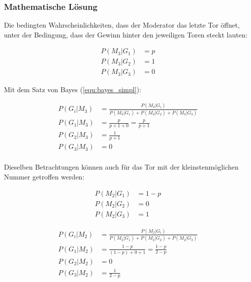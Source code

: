 \subsubsection{Mathematische Lösung}

Die bedingten Wahrscheinlichkeiten, dass der Moderator das letzte Tor öffnet, unter der Bedingung, dass der Gewinn hinter den jeweiligen Toren steckt lauten:

\begin{align*}
    P(M_3 | G_1) & = p \\
    P(M_3 | G_2) & = 1 \\
    P(M_3 | G_3) & = 0
\end{align*}

Mit dem Satz von Bayes (\autoref{equ:bayes_simpl}):

\begin{align*}
    P(G_i | M_3) & = \frac{P(M_3 | G_i)}{P(M_3 | G_1) + P(M_3 | G_2) + P(M_3 | G_3)} \\
    P(G_1 | M_3) & = \frac{p}{p+1+0} = \frac{p}{p+1}                                 \\
    P(G_2 | M_3) & = \frac{1}{p+1}                                                   \\
    P(G_3 | M_3) & = 0                                                               \\
\end{align*}

Dieselben Betrachtungen können auch für das Tor mit der kleinstenmöglichen Nummer getroffen werden:

\begin{align*}
    P(M_2 | G_1) & = 1 - p \\
    P(M_2 | G_2) & = 0     \\
    P(M_2 | G_3) & = 1
\end{align*}

\begin{align*}
    P(G_i | M_2) & = \frac{P(M_2 | G_i)}{P(M_2 | G_1) + P(M_2 | G_2) + P(M_2 | G_3)} \\
    P(G_1 | M_2) & = \frac{1-p}{(1-p)+0+1} = \frac{1-p}{2-p}                         \\
    P(G_2 | M_2) & = 0                                                               \\
    P(G_3 | M_2) & = \frac{1}{2-p}                                                   \\
\end{align*}

